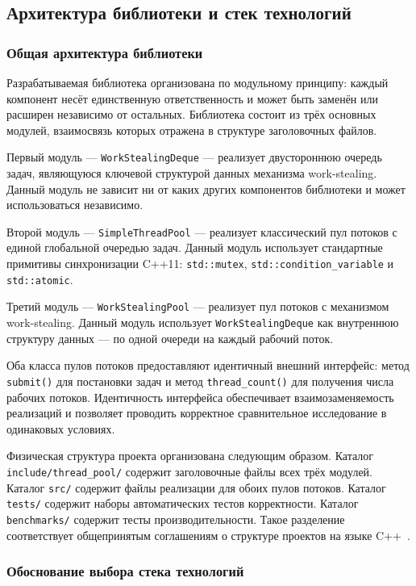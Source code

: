 \subsection{Архитектура библиотеки и стек технологий}

\subsubsection{Общая архитектура библиотеки}

Разрабатываемая библиотека организована по модульному принципу:
каждый компонент несёт единственную ответственность и может быть
заменён или расширен независимо от остальных. Библиотека состоит
из трёх основных модулей, взаимосвязь которых отражена в структуре
заголовочных файлов.

Первый модуль --- \texttt{WorkStealingDeque} --- реализует
двустороннюю очередь задач, являющуюся ключевой структурой данных
механизма work-stealing. Данный модуль не зависит ни от каких
других компонентов библиотеки и может использоваться независимо.

Второй модуль --- \texttt{SimpleThreadPool} --- реализует
классический пул потоков с единой глобальной очередью задач.
Данный модуль использует стандартные примитивы синхронизации
C++11: \texttt{std::mutex}, \texttt{std::condition\_variable}
и \texttt{std::atomic}.

Третий модуль --- \texttt{WorkStealingPool} --- реализует пул
потоков с механизмом work-stealing. Данный модуль использует
\texttt{WorkStealingDeque} как внутреннюю структуру данных ---
по одной очереди на каждый рабочий поток.

Оба класса пулов потоков предоставляют идентичный внешний
интерфейс: метод \texttt{submit()} для постановки задач и метод
\texttt{thread\_count()} для получения числа рабочих потоков.
Идентичность интерфейса обеспечивает взаимозаменяемость реализаций
и позволяет проводить корректное сравнительное исследование
в одинаковых условиях.

Физическая структура проекта организована следующим образом.
Каталог \texttt{include/thread\_pool/} содержит заголовочные
файлы всех трёх модулей. Каталог \texttt{src/} содержит файлы
реализации для обоих пулов потоков. Каталог \texttt{tests/}
содержит наборы автоматических тестов корректности. Каталог
\texttt{benchmarks/} содержит тесты производительности.
Такое разделение соответствует общепринятым соглашениям
о структуре проектов на языке C++~\cite{Williams2019}.

\subsubsection{Обоснование выбора стека технологий}


